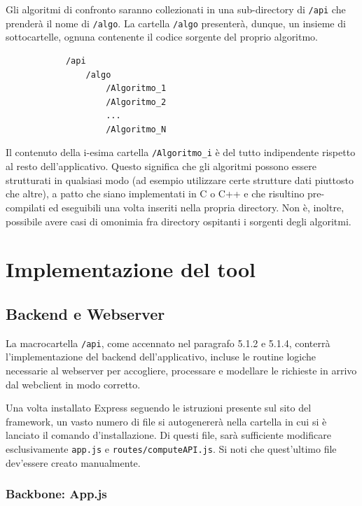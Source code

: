         Gli algoritmi di confronto saranno collezionati in una sub-directory di \verb|/api| che prenderà il nome di \verb|/algo|. La cartella \verb|/algo| presenterà, dunque, un insieme di sottocartelle, ognuna contenente il codice sorgente del proprio algoritmo.
        
       \begin{verbatim} 
            /api         
                /algo
                    /Algoritmo_1
                    /Algoritmo_2
                    ...
                    /Algoritmo_N
        \end{verbatim}
        
        Il contenuto della i-esima cartella \verb|/Algoritmo_i| è del tutto indipendente rispetto al resto dell'applicativo. Questo significa che gli algoritmi possono essere strutturati in qualsiasi modo (ad esempio utilizzare certe strutture dati piuttosto che altre), a patto che siano implementati in C o C++ e che risultino pre-compilati ed eseguibili una volta inseriti nella propria directory. Non è, inoltre, possibile avere casi di omonimia fra directory ospitanti i sorgenti degli algoritmi.
        
\section{Implementazione del tool}

\subsection{Backend e Webserver}
    
La macrocartella \verb|/api|, come accennato nel paragrafo 5.1.2 e 5.1.4, conterrà l'implementazione del backend dell'applicativo, incluse le routine logiche necessarie al webserver per accogliere, processare e modellare le richieste in arrivo dal webclient in modo corretto.
    
Una volta installato Express seguendo le istruzioni presente sul sito del framework, un vasto numero di file si autogenererà nella cartella in cui si è lanciato il comando d'installazione. Di questi file, sarà sufficiente modificare esclusivamente \verb|app.js| e \verb|routes/computeAPI.js|. Si noti che quest'ultimo file dev'essere creato manualmente. 

\subsubsection{Backbone: App.js}

